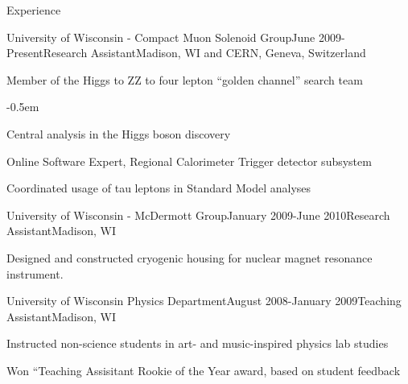 \documentclass{resume} %
\begin{document}
\begin{rSection}{Experience}
\begin{rSubsection}{University of Wisconsin - Compact Muon Solenoid Group}{June
2009-Present}{Research Assistant}{Madison, WI and CERN, Geneva, Switzerland}
\item Member of the Higgs to ZZ to four lepton ``golden channel'' search team
    \begin{list}{}{\leftmargin=1.5em} 
      \itemsep -0.5em \vspace{-0.5em} %
      \item Central analysis in the Higgs boson discovery
    \end{list}

\item Online Software Expert, Regional Calorimeter Trigger detector subsystem

\item Coordinated usage of tau leptons in Standard Model analyses

\end{rSubsection}

\begin{rSubsection}{University of Wisconsin - McDermott Group}{January 2009-June 2010}{Research Assistant}{Madison, WI}
\item Designed and constructed cryogenic housing for nuclear magnet
    resonance instrument.
\end{rSubsection}

\begin{rSubsection}{University of Wisconsin Physics Department}{August
2008-January 2009}{Teaching Assistant}{Madison, WI}
\item Instructed non-science students in art- and music-inspired physics
    lab studies
\item Won ``Teaching Assisitant Rookie of the Year award, based on
    student feedback
\end{rSubsection}



\end{rSection}

\end{document}

